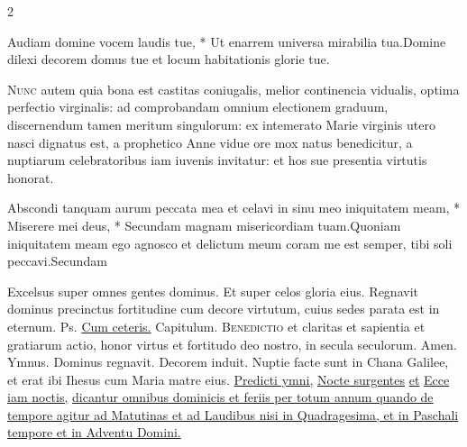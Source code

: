 \begin{multicols*}{2}
\begin{responsory}
{Audiam domine vocem laudis tue, * Ut enarrem universa mirabilia tua.}{Domine dilexi decorem domus tue et locum habitationis glorie tue.}
\end{responsory}%
\lettrine[lines=2]{\zallmancaps \color{Blue} N}{unc} autem quia bona est castitas coniugalis, melior continencia vidualis, optima perfectio virginalis: ad comprobandam omnium electionem graduum, discernendum tamen meritum singulorum: ex intemerato Marie virginis utero nasci dignatus est, a prophetico Anne vidue ore mox natus benedicitur, a nuptiarum celebratoribus iam iuvenis invitatur: et hos sue presentia virtutis honorat.
\begin{responsory-final}
{Abscondi tanquam aurum peccata mea et celavi in sinu meo iniquitatem meam, * Miserere mei deus, * Secundam magnam misericordiam tuam.}{Quoniam iniquitatem meam ego agnosco et delictum meum coram me est semper, tibi soli peccavi.}{Secundam}
\end{responsory-final}%
\newline \V Excelsus super omnes gentes dominus. \R Et super celos gloria eius.
 Regnavit dominus precinctus fortitudine cum decore virtutum, cuius sedes parata est in eternum. {\color{Red} Ps.}  \ul{Cum ceteris.} {\color{Red} Capitulum.}
\lettrine[lines=2]{\zallmancaps \color{Red} B}{enedictio} et claritas et sapientia et gratiarum actio, honor virtus et fortitudo deo nostro, in secula seculorum. Amen. {\color{Red} Ymnus.}
\newline \V Dominus regnavit. \R Decorem induit.
 Nuptie facte sunt in Chana Galilee, et erat ibi Ihesus cum Maria matre eius.
\newline \ul{Predicti ymni,} \hyperlink{nocte-surgentes}{Nocte surgentes} \ul{et} \hyperlink{ecce-iam-noctis}{Ecce iam noctis,} \ul{dicantur omnibus dominicis et feriis per totum annum quando de tempore agitur ad Matutinas et ad Laudibus nisi in Quadragesima, et in Paschali tempore et in Adventu Domini.}

\end{multicols*}
